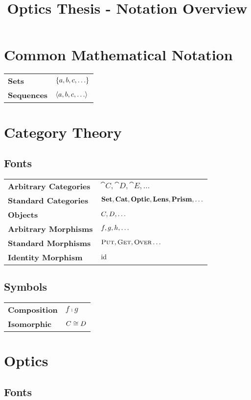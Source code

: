 \documentclass{article}
\title{Optics Thesis - Notation Overview}
\begin{document}
\section{Common Mathematical Notation}

\begin{tabular}{ll}
  \textbf{Sets} & $\left\{ a,b,c,\ldots\right\}$ \\
  \textbf{Sequences} & $\left\langle a,b,c,\ldots\right\rangle$
\end{tabular}

\section{Category Theory}

\subsection{Fonts}

\begin{tabular}{ll}
  \textbf{Arbitrary Categories} & $\cat{C}, \cat{D}, \cat{E}, \ldots$ \\
  \textbf{Standard Categories} & $\textbf{Set}, \textbf{Cat}, \textbf{Optic}, \textbf{Lens}, \textbf{Prism}, \ldots$ \\
  \textbf{Objects} & $C, D, \ldots$ \\
  \textbf{Arbitrary Morphisms} & $f, g, h, \ldots$ \\
  \textbf{Standard Morphisms} & $\textsc{Put}, \textsc{Get}, \textsc{Over} \ldots$ \\
  \textbf{Identity Morphism} & $\mathrm{id}$ \\
\end{tabular}

\subsection{Symbols}

\begin{tabular}{ll}
  \textbf{Composition} & $f \comp g$ \\
  \textbf{Isomorphic} & $C \cong D$
\end{tabular}

\section{Optics}

\subsection{Fonts}
\end{document}
